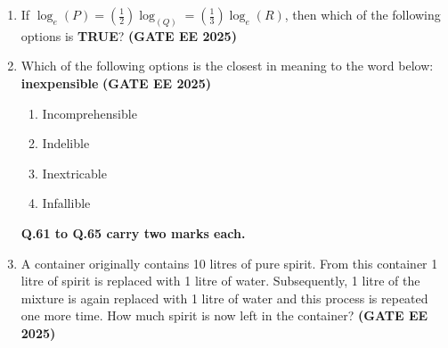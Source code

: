 \documentclass[journal,12pt,onecolumn]{IEEEtran}
\theoremstyle{remark}
\begin{document}
{\begin{enumerate}
\begin{enumerate}
    \item to visit India
    \item visiting to India
    \item to visit
    \item visit to
\end{enumerate}

\item  If $\log_e (P) =(\frac{1}{2}) \log_(Q)=(\frac{1}{3}) \log_e (R)$, then which of the following options is \textbf{TRUE}? \hfill \textbf{(GATE EE 2025)}
\begin{enumerate}
\end{enumerate}


\item  Which of the following options is the closest in meaning to the word below: \\\textbf{inexpensible} \hfill \textbf{(GATE EE 2025)}

\begin{enumerate}
    \item Incomprehensible
    \item Indelible
    \item Inextricable
    \item Infallible
\end{enumerate}

\textbf{Q.61 to Q.65 carry two marks each.}

\item  A container originally contains 10 litres of pure spirit. From this container 1 litre of spirit is replaced with 1 litre of water. Subsequently, 1 litre of the mixture is again replaced with 1 litre of water and this process is repeated one more time. How much spirit is now left in the container?  \hfill \textbf{(GATE EE 2025)} 
\begin{enumerate}
\end{enumerate}


\end{enumerate}}
\end{document}
